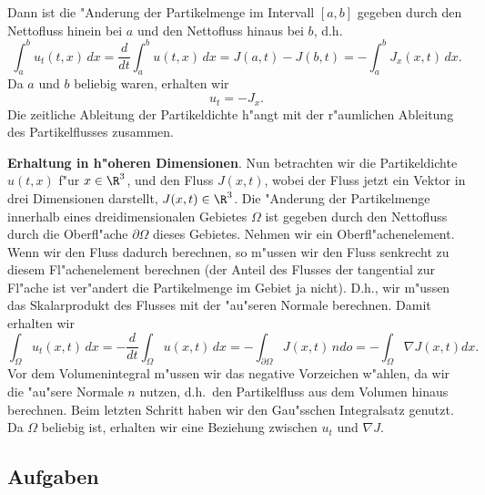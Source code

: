 Dann ist die "Anderung der Partikelmenge im Intervall $[a,b]$ gegeben durch den 
Nettofluss hinein bei $a$ und den Nettofluss hinaus bei $b$, d.h.
$$ \int_a^bu_t(t,x)\, dx = \frac d {dt}  \int_a^bu(t,x)\, dx 
  = J(a,t)-J(b,t) = - \int_a^b   J_x(x,t)\, dx.$$
Da $a$ und $b$ beliebig waren, erhalten wir
$$ u_t = -J_x.$$
Die zeitliche Ableitung der Partikeldichte h"angt 
mit der r"aumlichen Ableitung des Partikelflusses zusammen. \par\medskip
{\bf Erhaltung in h"oheren Dimensionen}. Nun betrachten wir die Partikeldichte 
$u(t,x)$ f"ur $x\in\R^3$, und den Fluss 
$J(x,t)$, wobei der Fluss jetzt ein Vektor in drei Dimensionen darstellt, 
$J(x,t)\in\R^3$. Die "Anderung der Partikelmenge innerhalb eines dreidimensionalen 
Gebietes $\Omega$ ist gegeben durch den Nettofluss durch die Oberfl"ache $\partial\Omega$  
dieses Gebietes. Nehmen wir ein Oberfl"achenelement. Wenn wir den Fluss dadurch  
berechnen, so m"ussen wir den Fluss senkrecht zu diesem 
Fl"achenelement berechnen
(der Anteil des Flusses der tangential zur Fl"ache ist ver"andert die Partikelmenge 
im Gebiet ja nicht). D.h., wir m"ussen das Skalarprodukt des Flusses mit der "au"seren 
Normale berechnen. Damit erhalten wir
$$ \int_\Omega u_t(x,t)\, dx = - \frac d {dt} \int_\Omega u(x,t)\, dx
= - \int_{\partial\Omega} J(x,t)\, n do = - \int_{\Omega} \nabla J(x,t) dx.$$
Vor dem Volumenintegral m"ussen wir das negative Vorzeichen w"ahlen, da wir die 
"au"sere Normale $n$ nutzen, d.h.\ den Partikelfluss aus dem Volumen hinaus berechnen. 
Beim letzten Schritt haben wir den Gau"sschen Integralsatz genutzt. Da $\Omega$ 
beliebig ist, erhalten wir eine Beziehung zwischen $u_t$ und $\nabla J$.
\par\label{fickschesXXGesetz}
\subsection*{Aufgaben}
\begin{auf}\chd\label{block9A3}

\end{auf}
\begin{auf}\chc\label{block9A4}

\end{auf}
\begin{auf}\chc\label{block9A5}

\end{auf}
\begin{auf}\chc\label{block9A6}

\end{auf}
